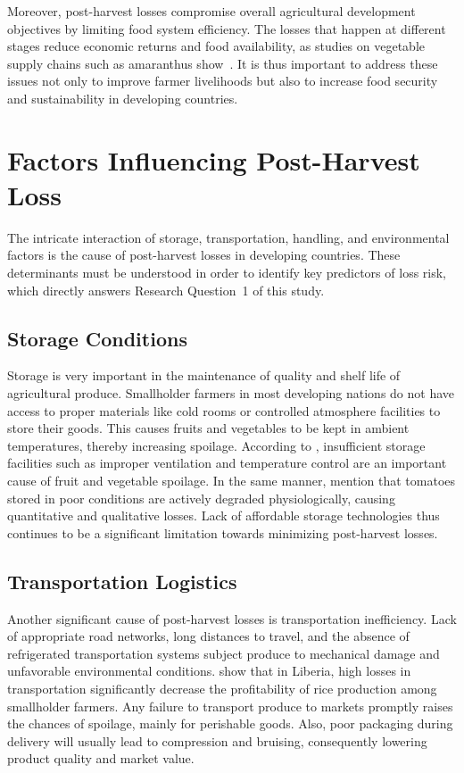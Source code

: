 Moreover, post-harvest losses compromise overall agricultural development objectives by limiting
food system efficiency. The losses that happen at different stages reduce economic returns and food
availability, as studies on vegetable supply chains such as amaranthus
show~\cite{oluoch2024causes}. It is thus important to address these issues not only to improve
farmer livelihoods but also to increase food security and sustainability in developing countries.


\section{Factors Influencing Post-Harvest Loss}

The intricate interaction of storage, transportation, handling, and environmental factors is the
cause of post-harvest losses in developing countries. These determinants must be understood in order
to identify key predictors of loss risk, which directly answers Research Question~1 of this study.

\subsection{Storage Conditions}

Storage is very important in the maintenance of quality and shelf life of agricultural produce.
Smallholder farmers in most developing nations do not have access to proper materials like cold
rooms or controlled atmosphere facilities to store their goods. This causes fruits and vegetables
to be kept in ambient temperatures, thereby increasing spoilage. According to
\cite{rajapaksha2021reducing}, insufficient storage facilities such as improper ventilation and
temperature control are an important cause of fruit and vegetable spoilage. In the same manner,
\cite{wakene2024comprehensive} mention that tomatoes stored in poor conditions are actively
degraded physiologically, causing quantitative and qualitative losses. Lack of affordable storage
technologies thus continues to be a significant limitation towards minimizing post-harvest losses.

\subsection{Transportation Logistics}

Another significant cause of post-harvest losses is transportation inefficiency. Lack of
appropriate road networks, long distances to travel, and the absence of refrigerated transportation
systems subject produce to mechanical damage and unfavorable environmental conditions.
\cite{pluato2024impact} show that in Liberia, high losses in transportation significantly decrease
the profitability of rice production among smallholder farmers. Any failure to transport produce to
markets promptly raises the chances of spoilage, mainly for perishable goods. Also, poor packaging
during delivery will usually lead to compression and bruising, consequently lowering product quality
and market value.

